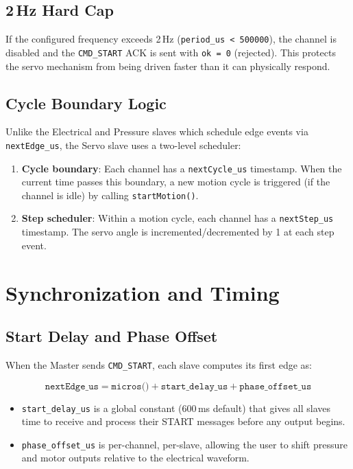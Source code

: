 \documentclass[11pt,a4paper]{article}
\begin{document}
\subsection{2\,Hz Hard Cap}

If the configured frequency exceeds 2\,Hz (\texttt{period\_us < 500000}), the
channel is disabled and the \texttt{CMD\_START} ACK is sent with
\texttt{ok = 0} (rejected). This protects the servo mechanism from being driven
faster than it can physically respond.

\subsection{Cycle Boundary Logic}

Unlike the Electrical and Pressure slaves which schedule edge events via
\texttt{nextEdge\_us}, the Servo slave uses a two-level scheduler:

\begin{enumerate}
  \item \textbf{Cycle boundary}: Each channel has a \texttt{nextCycle\_us} timestamp.
    When the current time passes this boundary, a new motion cycle is triggered
    (if the channel is idle) by calling \texttt{startMotion()}.
  \item \textbf{Step scheduler}: Within a motion cycle, each channel has a
    \texttt{nextStep\_us} timestamp. The servo angle is incremented/decremented
    by 1\textdegree{} at each step event.
\end{enumerate}

\section{Synchronization and Timing}

\subsection{Start Delay and Phase Offset}

When the Master sends \texttt{CMD\_START}, each slave computes its first edge as:

$$\texttt{nextEdge\_us} = \texttt{micros()} + \texttt{start\_delay\_us} + \texttt{phase\_offset\_us}$$

\begin{itemize}
  \item \texttt{start\_delay\_us} is a global constant (600\,ms default) that gives
    all slaves time to receive and process their START messages before any
    output begins.
  \item \texttt{phase\_offset\_us} is per-channel, per-slave, allowing the user
    to shift pressure and motor outputs relative to the electrical waveform.
\end{itemize}
\end{document}
